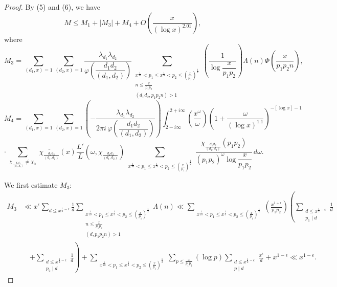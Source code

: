 \begin{proof}
By (5) and (6), we have
\begin{equation}\label{eq:chen7en}
M\leqslant M_1+|M_3|+M_4+O\left(\frac{x}{(\log x)^{2.01}}\right),
\end{equation}
where
\[
M_3=\sum_{(d_1,x)=1}\sum_{(d_2,x)=1}\frac{\lambda_{d_1}\lambda_{d_2}}{\varphi\left(\dfrac{d_1d_2}{(d_1,d_2)}\right)}
\sum_{\substack{x^{\frac1{10}}<p_1\leqslant x^{\frac13}<p_2\leqslant(\frac{x}{p_1})^{\frac12}\\n\leqslant\frac{x}{p_1p_2}\\(d_1d_2,p_1p_2n)>1}}
\left(\frac{1}{\log\dfrac{x}{p_1p_2}}\right)\Lambda(n)\Phi\left(\frac{x}{p_1p_2n}\right),
\]
\[
M_4=\sum_{(d_1,x)=1}\sum_{(d_2,x)=1}\left(-\frac{\lambda_{d_1}\lambda_{d_2}}{2\pi i\,\varphi\left(\dfrac{d_1d_2}{(d_1,d_2)}\right)}\right)
\int_{2-i\infty}^{2+i\infty}\left(\frac{x^\omega}{\omega}\right)\left(1+\frac{\omega}{(\log x)^{1.1}}\right)^{-[\log x]-1}
\]
\[
\cdot\sum_{\substack{\chi_{\frac{d_1d_2}{(d_1,d_2)}}\neq\chi_0}}\overline{\chi_{\frac{d_1d_2}{(d_1,d_2)}}}(x)\frac{L'}{L}\left(\omega,\chi_{\frac{d_1d_2}{(d_1,d_2)}}\right)
\sum_{\substack{x^{\frac1{10}}<p_1\leqslant x^{\frac13}<p_2\leqslant(\frac{x}{p_1})^{\frac12}}}
\frac{\chi_{\frac{d_1d_2}{(d_1,d_2)}}(p_1p_2)}{(p_1p_2)^\omega\log\dfrac{x}{p_1p_2}}\,d\omega.
\]

We first estimate $M_3$:
\begin{align*}
M_3&\ll x^\epsilon\sum_{d\leqslant x^{\frac12-\epsilon}}\frac1d
\sum_{\substack{x^{\frac1{10}}<p_1\leqslant x^{\frac13}<p_2\leqslant(\frac{x}{p_1})^{\frac12}\\n\leqslant\frac{x}{p_1p_2}\\(d,p_1p_2n)>1}}\Lambda(n)
\ll\sum_{\substack{x^{\frac1{10}}<p_1\leqslant x^{\frac13}<p_2\leqslant(\frac{x}{p_1})^{\frac12}}}
\left(\frac{x^{1+\epsilon}}{p_1p_2}\right)\left(\sum_{\substack{d\leqslant x^{\frac12-\epsilon}\\p_1\mid d}}\frac1d\right.\\
&\quad\left.+\sum_{\substack{d\leqslant x^{\frac12-\epsilon}\\p_2\mid d}}\frac1d\right)
+\sum_{\substack{x^{\frac1{10}}<p_1\leqslant x^{\frac13}<p_2\leqslant(\frac{x}{p_1})^{\frac12}}}\sum_{p\leqslant\frac{x}{p_1p_2}}(\log p)
\sum_{\substack{d\leqslant x^{\frac12-\epsilon}\\p\mid d}}\frac{x^\epsilon}{d}+x^{1-\epsilon}\ll x^{1-\epsilon}.\tag{8}
\end{align*}


\end{proof}
